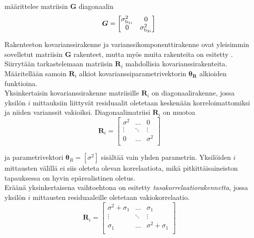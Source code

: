 \documentclass[finnish]{docopts}
\begin{document}
määrittelee matriisin $\bm{G}$ diagonaalin \\

$$
\bm{G} =
\begin{bmatrix}
\sigma^2_{\text{b}_{1i}} & 0 \\
0 & \sigma^2_{\text{b}_{2i}} \\
\end{bmatrix} \\
$$

Rakenteeton kovarianssirakenne ja varianssikomponenttirakenne ovat yleisimmin sovelletut matriisin $\bm{G}$ rakenteet, mutta myös muita rakenteita on esitetty \cite{west14}. \\

Siirrytään tarkastelemaan matriisin $\bm{R}_i$ mahdollisia kovarianssirakenteita. Määritellään samoin $\bm{R}_i$ alkiot kovarianssiparametrivektorin $\bm{\theta_R}$ alkioiden funktioina.\\

Yksinkertaisin kovarianssirakenne matriisille $\bm{R}_i$ on diagonaalirakenne, jossa yksilön $i$ mittauksiin liittyvät residuaalit oletetaan keskenään korreloimattomiksi ja niiden varianssit vakioiksi. Diagonaalimatriisi $\bm{R}_i$ on muotoa\\

$$
\bm{R}_i =
\begin{bmatrix}
\sigma^2 & \dots & 0 \\
\vdots & \ddots & \vdots \\
0 & \dots & \sigma^2 \\
\end{bmatrix}
$$

ja parametrivektori $\bm{\theta}_R = [\sigma^2]$ sisältää vain yhden parametrin. Yksilöiden $i$ mittausten välillä ei siis oleteta olevan korrelaatiota, mikä pitkittäisaineiston tapauksessa on hyvin epärealistinen oletus. \\

Eräänä yksinkertaisena vaihtoehtona on esitetty \textit{tasakorrelaatiorakennetta}, jossa yksilön $i$ mittausten residuaaleille oletetaan vakiokorrelaatio. \\

$$
\bm{R}_i =
\begin{bmatrix}
\sigma^2 + \sigma_1 & \dots & \sigma_1 \\
\vdots & \ddots & \vdots \\
\sigma_1 & \dots & \sigma^2 + \sigma_1 \\
\end{bmatrix}
$$
\end{document}

